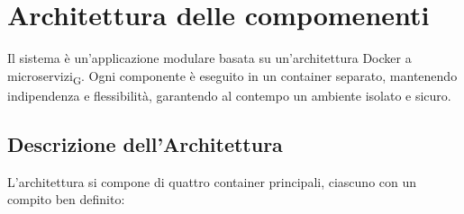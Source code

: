 \section{Architettura delle compomenenti }


Il sistema è un'applicazione modulare basata su un'architettura Docker a microservizi\textsubscript{G}. Ogni componente è eseguito in un container separato, mantenendo indipendenza e flessibilità, garantendo al contempo un ambiente isolato e sicuro.

\subsection{Descrizione dell'Architettura}

L'architettura si compone di quattro container principali, ciascuno con un compito ben definito:

